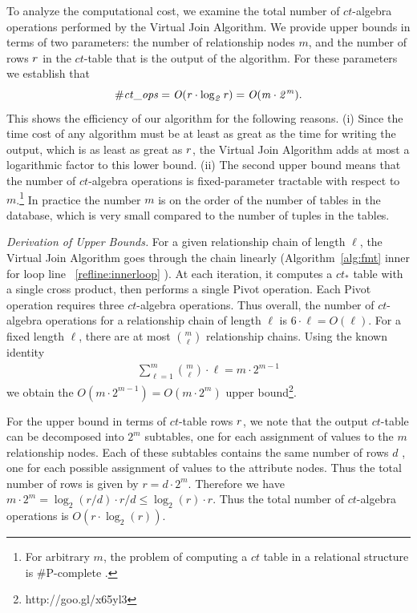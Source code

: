 \documentclass{vldb}
\newcommand{\ct}{\mathit{ct}}
\begin{document}
To  analyze the computational cost, we examine the total number of $\ct$-algebra operations performed by the Virtual Join Algorithm. 
%
We provide  upper bounds in terms of two parameters: the number of relationship nodes  $m$, and  the number of rows $r$  in the $\ct$-table that is the output of the algorithm. 
For these parameters we establish that
$$\it{\# \ct\_\it{ops}} = O(r \cdot \log_{2} r) = O(m \cdot 2^{m}) .$$
This shows the efficiency of our algorithm for the following reasons.
(i) Since the time cost of any algorithm must be at least as great as the time for writing the output, which is as least as great as $r$, 
the Virtual Join Algorithm adds at most a logarithmic factor to this lower bound. 
(ii)  The second upper bound means that the number of $\ct$-algebra operations is fixed-parameter tractable with respect to $m$.\footnote{For arbitrary $m$, the problem of computing a $\ct$ table in a relational structure is \#P-complete \cite[Prop.12.4]{Domingos2007}.} In practice the number $m$ is on the order of the number of tables in the database, 
which is very small compared to the number of tuples in the tables.

\emph{Derivation of Upper Bounds.}
For a given relationship chain of length $\ell$, the Virtual Join Algorithm goes through the chain linearly (Algorithm~\ref{alg:fmt} inner for loop line ~\ref {reﬂine:innerloop}%
). 
At each iteration, it computes a $\ct_{*}$ table with a single cross product, then performs a single Pivot operation.
 Each Pivot operation requires three  $\ct$-algebra operations. 
Thus overall, the number of  $\ct$-algebra operations for a relationship chain of length $\ell$ is $6 \cdot \ell = O(\ell)$. For a fixed length $\ell$, there are at most $\binom{m}{\ell}$ relationship chains. Using the known identity
\begin{align} 
\sum_{\ell=1}^{m} {m\choose \ell} \cdot \ell = m \cdot  2^{m-1} \label{eq:upperbound}
\end{align}
we obtain the $O(m \cdot  2^{m-1}) = O(m \cdot  2^{m})$ upper bound\footnote{http://goo.gl/x65yl3}. 

For the upper bound in terms of $\ct$-table rows $r$, we note that the output $\ct$-table can be decomposed into $2^{m}$ subtables, one for each assignment of values to the $m$ relationship nodes. 
Each of these subtables contains the same number of rows $d$ , one for each possible assignment of values to the attribute nodes. 
Thus the total number of rows is given by $r = d \cdot 2^m.$ 
Therefore we have 
$m \cdot 2^{m} = \log_{2} (r/d) \cdot r/d \leq \log_{2}(r) \cdot r.$
Thus the total number of $\ct$-algebra operations is $O(r \cdot \log_{2}(r))$.
\end{document}
